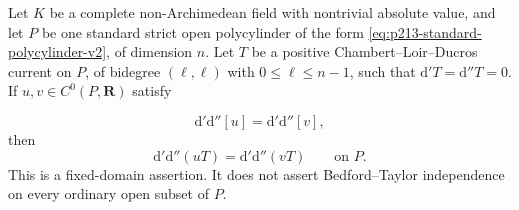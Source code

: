 \begin{proposition}\label{prop:p213-fixed-polycylinder-v2-candidate}
Let \(K\) be a complete non-Archimedean field with nontrivial absolute
value, and let \(P\) be one standard strict open polycylinder of the form
\eqref{eq:p213-standard-polycylinder-v2}, of dimension \(n\). Let \(T\) be
a positive Chambert--Loir--Ducros current on \(P\), of bidegree
\((\ell,\ell)\) with
\(0\leq\ell\leq n-1\), such that \(\mathrm d'T=\mathrm d''T=0\). If
\(u,v\in C^0(P,\mathbf R)\) satisfy

\[
                  \mathrm d'\mathrm d''[u]
                  =\mathrm d'\mathrm d''[v],
\]
then
\begin{equation}\label{eq:p213-fixed-polycylinder-bt-v2}
             \mathrm d'\mathrm d''(uT)
             =\mathrm d'\mathrm d''(vT)
             \qquad\text{on }P.
\end{equation}
This is a fixed-domain assertion. It does not assert Bedford--Taylor
independence on every ordinary open subset of \(P\).
\end{proposition}
